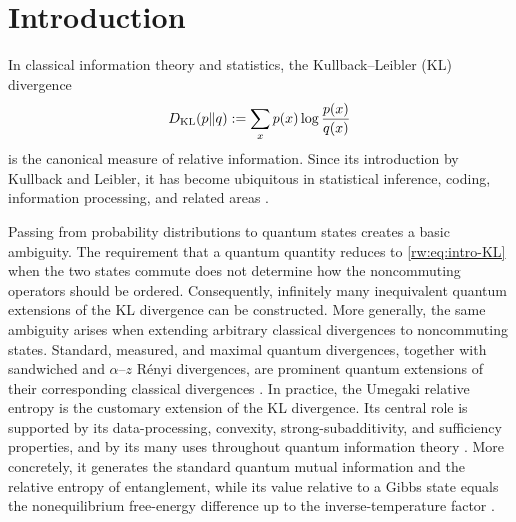 \documentclass[11pt]{article}
\theoremstyle{remark}
\newcommand{\1}{\mathbbm{1}}
\begin{document}
\newpage
\tableofcontents


\section{Introduction}
\label{rw:sec:introduction}

In classical information theory and statistics, the
Kullback--Leibler (KL) divergence
\begin{equation}
 D_{\rm KL}(p\Vert q):=\sum_xp(x)\log\frac{p(x)}{q(x)}
 \label{rw:eq:intro-KL}
\end{equation}
is the canonical measure of relative information.  Since its
introduction by Kullback and Leibler, it has become ubiquitous in
statistical inference, coding, information processing, and related
areas \cite{kullback1951information,cover2006elements}.

Passing from probability distributions to quantum states creates a
basic ambiguity.  The requirement that a quantum quantity reduces to
\eqref{rw:eq:intro-KL} when the two states commute does not determine
how the noncommuting operators should be ordered.  Consequently,
infinitely many inequivalent quantum extensions of the KL divergence
can be constructed.  More generally, the same ambiguity arises when
extending arbitrary classical divergences to noncommuting states.
Standard, measured, and maximal quantum divergences, together with
sandwiched and $\alpha$--$z$ R\'enyi divergences, are prominent
quantum extensions of their corresponding classical divergences
\cite{petz1986quasi,hiai2011quantum,hiai2017different,
matsumoto2018new,audenaert2015alphaz}.  In practice, the Umegaki
relative entropy is the customary extension of the KL divergence.
Its central role is supported by its data-processing, convexity,
strong-subadditivity, and sufficiency properties, and by its many
uses throughout quantum information theory
\cite{Umegaki-RelativeEntropy-1962,lieb1973strong,
Petz-SufficiencyChannels-1978,vedral2002role,petz2007quantum}.
More concretely, it generates the standard quantum mutual information
and the relative entropy of entanglement, while its value relative to
a Gibbs state equals the nonequilibrium free-energy difference up to
the inverse-temperature factor
\cite{vedral2002role,wilming2017axiomatic}.
\end{document}
